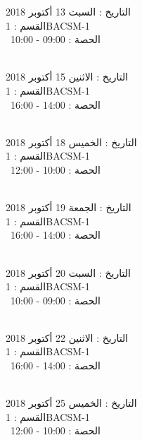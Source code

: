 التاريخ : السبت 13 أكتوبر 2018 \\
القسم : 1BACSM-1 \\
 \  
الحصة : 09:00 - 10:00 \\
\par
\noindent\makebox[\linewidth]{\rule{\paperwidth}{0.4pt}}
 \\
التاريخ : الاثنين 15 أكتوبر 2018 \\
القسم : 1BACSM-1 \\
 \  
الحصة : 14:00 - 16:00 \\
\par
\noindent\makebox[\linewidth]{\rule{\paperwidth}{0.4pt}}
 \\
التاريخ : الخميس 18 أكتوبر 2018 \\
القسم : 1BACSM-1 \\
 \  
الحصة : 10:00 - 12:00 \\
\par
\noindent\makebox[\linewidth]{\rule{\paperwidth}{0.4pt}}
 \\
التاريخ : الجمعة 19 أكتوبر 2018 \\
القسم : 1BACSM-1 \\
 \  
الحصة : 14:00 - 16:00 \\
\par
\noindent\makebox[\linewidth]{\rule{\paperwidth}{0.4pt}}
 \\
التاريخ : السبت 20 أكتوبر 2018 \\
القسم : 1BACSM-1 \\
 \  
الحصة : 09:00 - 10:00 \\
\par
\noindent\makebox[\linewidth]{\rule{\paperwidth}{0.4pt}}
 \\
التاريخ : الاثنين 22 أكتوبر 2018 \\
القسم : 1BACSM-1 \\
 \  
الحصة : 14:00 - 16:00 \\
\par
\noindent\makebox[\linewidth]{\rule{\paperwidth}{0.4pt}}
 \\
التاريخ : الخميس 25 أكتوبر 2018 \\
القسم : 1BACSM-1 \\
 \  
الحصة : 10:00 - 12:00 \\
\par
